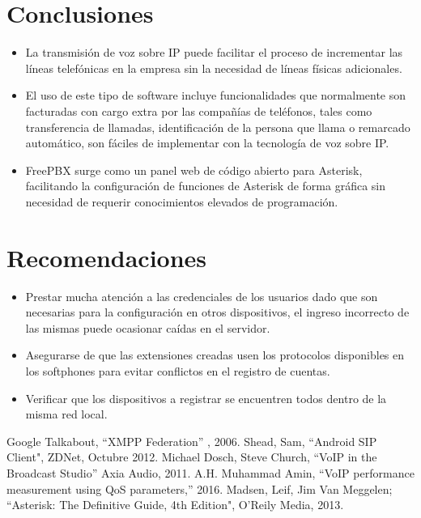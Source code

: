 \documentclass[conference]{IEEEtran}
\begin{document}
\section{Conclusiones}
\begin{itemize}
	\item La transmisión de voz sobre IP puede facilitar el proceso de incrementar las líneas telefónicas en la empresa sin la necesidad de líneas físicas adicionales.
	\item El uso de este tipo de software incluye funcionalidades que normalmente son facturadas con cargo extra por las compañías de teléfonos, tales como transferencia de llamadas, identificación de la persona que llama o remarcado automático, son fáciles de implementar con la tecnología de voz sobre IP.
  \item FreePBX surge como un panel web de código abierto para Asterisk, facilitando la configuración de funciones de Asterisk de forma gráfica sin necesidad de requerir conocimientos elevados de programación.
\end{itemize}

\section{Recomendaciones}
\begin{itemize}
	\item Prestar mucha atención a las credenciales de los usuarios dado que son necesarias para la configuración en otros dispositivos, el ingreso incorrecto de las mismas puede ocasionar caídas en el servidor.
	\item Asegurarse de que las extensiones creadas usen los protocolos disponibles en los softphones para evitar conflictos en el registro de cuentas.
  \item Verificar que los dispositivos a registrar se encuentren todos dentro de la misma red local.
\end{itemize}


\begin{thebibliography}{00}
  Google Talkabout, ``XMPP Federation'' , 2006.
 Shead, Sam, ``Android SIP Client", ZDNet, Octubre 2012.
 Michael Dosch, Steve Church, ``VoIP in the Broadcast Studio''  Axia Audio, 2011.
 A.H. Muhammad Amin, ``VoIP performance measurement using QoS parameters,''  2016.
 Madsen, Leif, Jim Van Meggelen; ``Asterisk: The Definitive Guide, 4th Edition", O'Reily Media, 2013.
\end{thebibliography}
\end{document}
